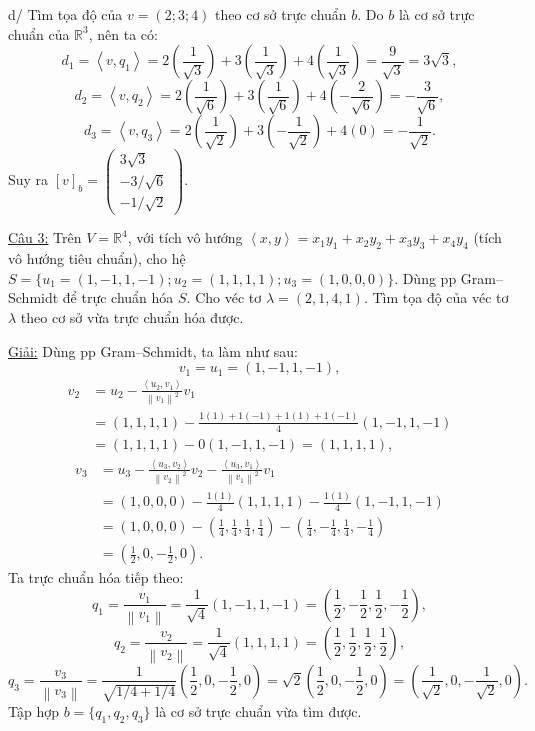 \documentclass[12pt,a4paper]{article}
\newcommand{\R}{\mathbb{R}}
\newcommand{\ip}[2]{\left\langle #1,#2\right\rangle}
\newcommand{\norm}[1]{\left\|#1\right\|}
\begin{document}
d/ Tìm tọa độ của $v=(2; 3; 4)$ theo cơ sở trực chuẩn $b$.
Do $b$ là cơ sở trực chuẩn của $\R^3$, nên ta có:
\[
d_1 = \ip{v}{q_1} = 2\left(\frac{1}{\sqrt{3}}\right) + 3\left(\frac{1}{\sqrt{3}}\right) + 4\left(\frac{1}{\sqrt{3}}\right) = \frac{9}{\sqrt{3}} = 3\sqrt{3},
\]
\[
d_2 = \ip{v}{q_2} = 2\left(\frac{1}{\sqrt{6}}\right) + 3\left(\frac{1}{\sqrt{6}}\right) + 4\left(-\frac{2}{\sqrt{6}}\right) = -\frac{3}{\sqrt{6}},
\]
\[
d_3 = \ip{v}{q_3} = 2\left(\frac{1}{\sqrt{2}}\right) + 3\left(-\frac{1}{\sqrt{2}}\right) + 4(0) = -\frac{1}{\sqrt{2}}.
\]
Suy ra $[v]_b = \begin{pmatrix} 3\sqrt{3} \\ -3/\sqrt{6} \\ -1/\sqrt{2} \end{pmatrix}$.

\vspace{0.5cm}

\underline{Câu 3:} Trên $V=\R^4$, với tích vô hướng $\ip{x}{y} = x_1y_1+x_2y_2+x_3y_3+x_4y_4$ (tích vô hướng tiêu chuẩn), cho hệ
$S=\{u_1=(1, -1, 1, -1); u_2=(1, 1, 1, 1); u_3=(1, 0, 0, 0)\}$.
Dùng pp Gram--Schmidt để trực chuẩn hóa $S$. 
Cho véc tơ $\lambda=(2, 1, 4, 1)$. Tìm tọa độ của véc tơ $\lambda$ theo cơ sở vừa trực chuẩn hóa được.

\underline{Giải:}
Dùng pp Gram--Schmidt, ta làm như sau:
\[
v_1 = u_1 = (1, -1, 1, -1),
\]
\begin{align*}
v_2 &= u_2 - \frac{\ip{u_2}{v_1}}{\norm{v_1}^2}v_1 \\
    &= (1, 1, 1, 1) - \frac{1(1) + 1(-1) + 1(1) + 1(-1)}{4}(1, -1, 1, -1) \\
    &= (1, 1, 1, 1) - 0(1, -1, 1, -1) = (1, 1, 1, 1),
\end{align*}
\begin{align*}
v_3 &= u_3 - \frac{\ip{u_3}{v_2}}{\norm{v_2}^2}v_2 - \frac{\ip{u_3}{v_1}}{\norm{v_1}^2}v_1 \\
    &= (1, 0, 0, 0) - \frac{1(1)}{4}(1, 1, 1, 1) - \frac{1(1)}{4}(1, -1, 1, -1) \\
    &= (1, 0, 0, 0) - \left(\frac{1}{4}, \frac{1}{4}, \frac{1}{4}, \frac{1}{4}\right) - \left(\frac{1}{4}, -\frac{1}{4}, \frac{1}{4}, -\frac{1}{4}\right) \\
    &= \left(\frac{1}{2}, 0, -\frac{1}{2}, 0\right).
\end{align*}
Ta trực chuẩn hóa tiếp theo:
\[
q_1 = \frac{v_1}{\norm{v_1}} = \frac{1}{\sqrt{4}}(1, -1, 1, -1) = \left(\frac{1}{2}, -\frac{1}{2}, \frac{1}{2}, -\frac{1}{2}\right),
\]
\[
q_2 = \frac{v_2}{\norm{v_2}} = \frac{1}{\sqrt{4}}(1, 1, 1, 1) = \left(\frac{1}{2}, \frac{1}{2}, \frac{1}{2}, \frac{1}{2}\right),
\]
\[
q_3 = \frac{v_3}{\norm{v_3}} = \frac{1}{\sqrt{1/4 + 1/4}}\left(\frac{1}{2}, 0, -\frac{1}{2}, 0\right) = \sqrt{2}\left(\frac{1}{2}, 0, -\frac{1}{2}, 0\right) = \left(\frac{1}{\sqrt{2}}, 0, -\frac{1}{\sqrt{2}}, 0\right).
\]
Tập hợp $b = \{q_1, q_2, q_3\}$ là cơ sở trực chuẩn vừa tìm được.
\end{document}
